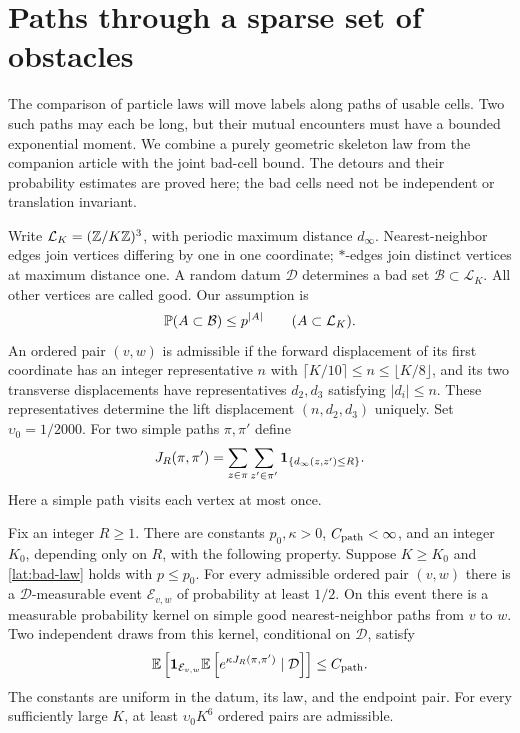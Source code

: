 \section{Paths through a sparse set of obstacles}\label{lat:section}

The comparison of particle laws will move labels along paths of usable
cells.  Two such paths may each be long, but their mutual encounters must
have a bounded exponential moment. We combine a purely geometric skeleton
law from the companion article with the joint bad-cell bound. The detours
and their probability estimates are proved here; the bad cells need not be
independent or translation invariant.

Write $\mathcal L_K=(\mathbb Z/K\mathbb Z)^3$, with periodic maximum distance $d_\infty$.
Nearest-neighbor edges join vertices differing by one in one coordinate;
$*$-edges join distinct vertices at maximum distance one.  A random datum
$\mathcal D$ determines a bad set $\mathcal B\subset\mathcal L_K$.
All other vertices are called good.  Our assumption is
\begin{equation}\label{lat:bad-law}
 \mathbb P(A\subset\mathcal B)\le p^{|A|}
 \qquad(A\subset\mathcal L_K).
\end{equation}
An ordered pair $(v,w)$ is admissible if the forward displacement of its
first coordinate has an integer representative $n$ with
$\lceil K/10\rceil\le n\le\lfloor K/8\rfloor$, and its two transverse
displacements have representatives $d_2,d_3$ satisfying $|d_i|\le n$.
These representatives determine the lift displacement $(n,d_2,d_3)$ uniquely.
Set $\upsilon_0=1/2000$.
For two simple paths $\pi,\pi'$ define
\begin{equation}\label{lat:contact-definition}
 J_R(\pi,\pi')=
 \sum_{z\in\pi}\sum_{z'\in\pi'}
              \mathbf 1_{\{d_\infty(z,z')\le R\}}.
\end{equation}
Here a simple path visits each vertex at most once.

\begin{proposition}\label{lat:paths}
Fix an integer $R\ge1$.  There are constants
$p_0,\kappa>0$, $C_{\rm path}<\infty$, and an integer $K_0$, depending
only on $R$, with the following property.  Suppose $K\ge K_0$ and
\eqref{lat:bad-law} holds with $p\le p_0$.  For every admissible ordered
pair $(v,w)$ there is a $\mathcal D$-measurable event $\mathcal E_{v,w}$
of probability at least $1/2$.  On this event there is a measurable
probability kernel on simple good nearest-neighbor paths from $v$ to $w$.
Two independent draws from this kernel, conditional on $\mathcal D$,
satisfy
\begin{equation}\label{lat:encounter}
 \mathbb E\left[
   \mathbf 1_{\mathcal E_{v,w}}
   \mathbb E\left[e^{\kappa J_R(\pi,\pi')}\mid\mathcal D\right]
       \right]\le C_{\rm path}.
\end{equation}
The constants are uniform in the datum, its law, and the endpoint pair.
For every sufficiently large $K$, at least $\upsilon_0K^6$ ordered pairs
are admissible.
\end{proposition}

